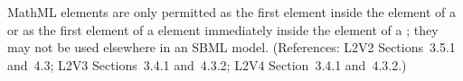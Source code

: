 MathML  elements are only permitted as the first element
inside the  element of a \FunctionDefinition or as the
first element of a  element immediately inside the
 element of a \FunctionDefinition; they may not be used
elsewhere in an SBML model.  (References: L2V2 Sections~3.5.1 and~4.3;
L2V3 Sections~3.4.1 and~4.3.2; L2V4 Section~3.4.1 and~4.3.2.)

